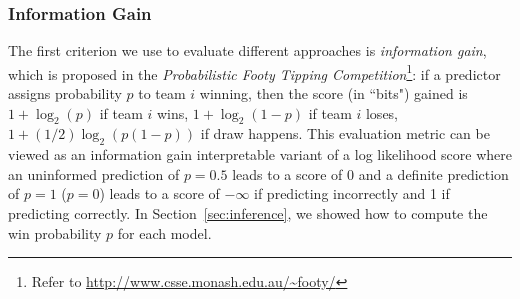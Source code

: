 \subsubsection{Information Gain}
\label{sec:informationGain}

The first criterion we use to evaluate different approaches is
\emph{information gain}, which is proposed in the \emph{Probabilistic Footy
Tipping Competition}\footnote{Refer to
\url{http://www.csse.monash.edu.au/~footy/}}: if a predictor assigns
probability $p$ to team $i$ winning, then the score (in ``bits")
gained is $1+\log_2(p)$ if team $i$ wins, $1+\log_2(1-p)$ if team $i$ loses, $1+(1/2)\log_2(p(1-p))$ if draw happens.
This evaluation metric can be viewed as an information gain
interpretable variant of a log likelihood score where an uninformed
prediction of $p=0.5$ leads to a score of 0 and a definite prediction
of $p=1$ ($p=0$) leads to a score of $-\infty$ if predicting
incorrectly and 1 if predicting correctly.
In Section~\ref{sec:inference}, we showed how to compute the win
probability $p$ for each model.
%
%




